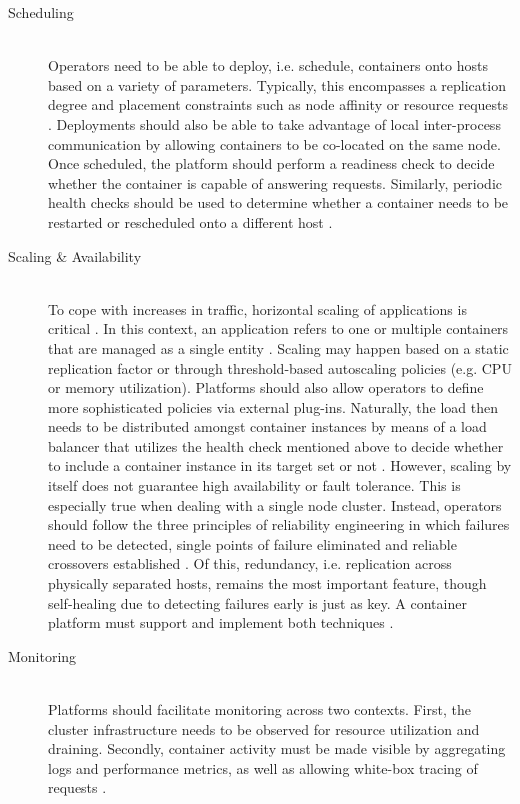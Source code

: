 \begin{description}
  \item[Scheduling]
  \hfill \\
  Operators need to be able to deploy, i.e. schedule, containers onto hosts based on a variety of parameters. Typically, this encompasses a replication degree and placement constraints such as \gls{node affinity} or resource requests \cite[p.~225]{casalicchio2019container}. Deployments should also be able to take advantage of local inter-process communication by allowing containers to be co-located on the same node. Once scheduled, the platform should perform a readiness check to decide whether the container is capable of answering requests. Similarly, periodic health checks should be used to determine whether a container needs to be restarted or rescheduled onto a different host \cite[p.~2]{al2019container}.

  \item[Scaling \& Availability]
  \hfill \\
  To cope with increases in traffic, horizontal scaling of applications is critical \cite[p.~1]{al2019container}. In this context, an application refers to one or multiple containers that are managed as a single entity \cite[p.~44]{khan2017key} \cite[p.~2]{pahl2017cloud}. Scaling may happen based on a static replication factor or through threshold-based autoscaling policies (e.g. \acs{CPU} or memory utilization). Platforms should also allow operators to define more sophisticated policies via external plug-ins. Naturally, the load then needs to be distributed amongst container instances by means of a load balancer that utilizes the health check mentioned above to decide whether to include a container instance in its target set or not \cite[pp.~225--226]{casalicchio2019container} \cite[p.~2]{al2019container}. However, scaling by itself does not guarantee high availability or fault tolerance. This is especially true when dealing with a single node cluster. Instead, operators should follow the three principles of reliability engineering in which failures need to be detected, single points of failure eliminated and reliable crossovers established \cite[p.~45]{khan2017key}. Of this, redundancy, i.e. replication across physically separated hosts, remains the most important feature, though self-healing due to detecting failures early is just as key. A container platform must support and implement both techniques \cite[p.~176]{vayghan2019microservice} \cite[p.~53]{burns2016borg}.

  \item[Monitoring]
  \hfill \\
  Platforms should facilitate monitoring across two contexts. First, the cluster infrastructure needs to be observed for resource utilization and draining. Secondly, container activity must be made visible by aggregating logs and performance metrics, as well as allowing \gls{white-box tracing} of requests \cite[p.~47]{khan2017key}.
\end{description}

